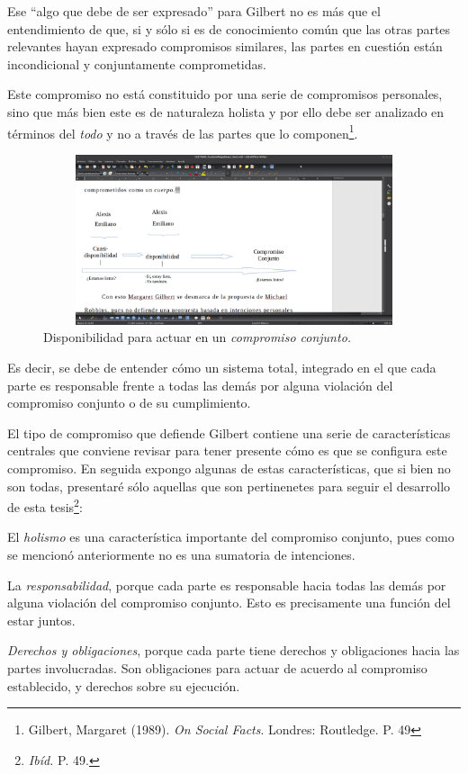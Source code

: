 \documentclass[oneside]{book}
\begin{document}
Ese “algo que debe de ser expresado” para Gilbert no es más que el entendimiento de que, si y sólo si es de conocimiento común que las otras partes relevantes hayan expresado compromisos similares, las partes en cuestión están incondicional y conjuntamente comprometidas.

Este compromiso no está constituido por una serie de compromisos personales, sino que más bien este es de naturaleza holista y por ello debe ser analizado en términos del \textit{todo} y no a través de las partes que lo componen\footnote{Gilbert, Margaret (1989). \textit{On Social Facts}. Londres: Routledge. P. 49}. 

\begin{figure}[h]
	\centering
    \includegraphics[width=12cm, height=5cm]{img/esquema_2}
	\caption{Disponibilidad para actuar en un \textit{compromiso conjunto.}}
\end{figure}


Es decir, se debe de entender cómo un sistema total, integrado en el que cada parte es responsable frente a todas las demás por alguna violación del compromiso conjunto o de su cumplimiento. 

El tipo de compromiso que defiende Gilbert contiene una serie de características centrales que conviene revisar para tener presente cómo es que se configura este compromiso. En seguida expongo algunas de estas características, que si bien no son todas, presentaré sólo aquellas que son pertinenetes para seguir el desarrollo de esta tesis\footnote{\textit{Ibíd.} P. 49.}:

El \textit{holismo} es una característica importante del compromiso conjunto, pues como se mencionó anteriormente no es una sumatoria de intenciones.

La \textit{responsabilidad}, porque cada parte es responsable hacia todas las demás por alguna violación del compromiso conjunto. Esto es precisamente una función del estar juntos. 

\textit{Derechos y obligaciones}, porque cada parte tiene derechos y obligaciones hacia las partes involucradas. Son obligaciones para actuar de acuerdo al compromiso establecido, y derechos sobre su ejecución. 
\end{document}
